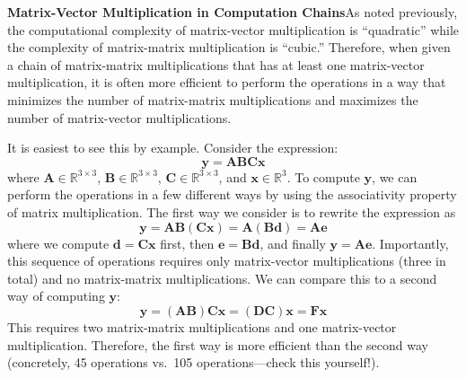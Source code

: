 \textbf{Matrix-Vector Multiplication in Computation Chains}\quad As noted previously, the computational complexity of matrix-vector multiplication is ``quadratic'' while the complexity of matrix-matrix multiplication is ``cubic.'' Therefore, when given a chain of matrix-matrix multiplications that has at least one matrix-vector multiplication, it is often more efficient to perform the operations in a way that minimizes the number of matrix-matrix multiplications and maximizes the number of matrix-vector multiplications. 

It is easiest to see this by example. Consider the expression:
\begin{equation*}
    \mathbf{y} = \mathbf{A}\mathbf{B}\mathbf{C}\mathbf{x}
\end{equation*}
where $\mathbf{A} \in \mathbb{R}^{3\times 3}$, $\mathbf{B} \in \mathbb{R}^{3\times 3}$, $\mathbf{C} \in \mathbb{R}^{3\times 3}$, and $\mathbf{x} \in \mathbb{R}^3$. To compute $\mathbf{y}$, we can perform the operations in a few different ways by using the associativity property of matrix multiplication. The first way we consider is to rewrite the expression as
\begin{equation*}
    \mathbf{y} = \mathbf{A}\mathbf{B}(\mathbf{C}\mathbf{x}) = \mathbf{A}(\mathbf{B}\mathbf{d}) = \mathbf{A}\mathbf{e}
\end{equation*}
where we compute $\mathbf{d} = \mathbf{C}\mathbf{x}$ first, then $\mathbf{e} = \mathbf{B}\mathbf{d}$, and finally $\mathbf{y} = \mathbf{A}\mathbf{e}$. Importantly, this sequence of operations requires only matrix-vector multiplications (three in total) and no matrix-matrix multiplications. We can compare this to a second way of computing $\mathbf{y}$:
\begin{equation*}
    \mathbf{y} = (\mathbf{A}\mathbf{B})\mathbf{C}\mathbf{x} = (\mathbf{DC})\mathbf{x} = \mathbf{F}\mathbf{x}
\end{equation*}
This requires two matrix-matrix multiplications and one matrix-vector multiplication. Therefore, the first way is more efficient than the second way (concretely, 45 operations vs.\ 105 operations---check this yourself!).

